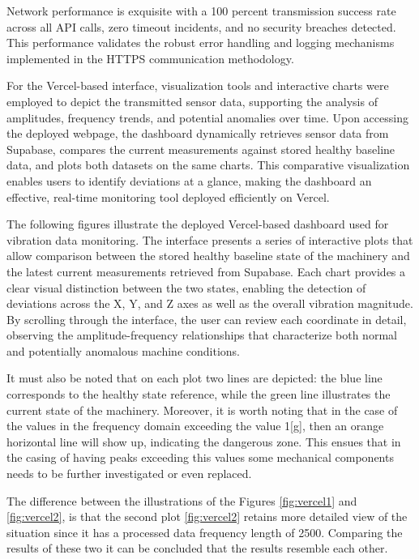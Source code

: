{	Network performance is exquisite with a 100 percent transmission success rate across all API calls, zero timeout incidents, and no security breaches detected. This performance validates the robust error handling and logging mechanisms implemented in the HTTPS communication methodology.
	
	For the Vercel-based interface, visualization tools and interactive charts were employed to depict the transmitted sensor data, supporting the analysis of amplitudes, frequency trends, and potential anomalies over time. Upon accessing the deployed webpage, the dashboard dynamically retrieves sensor data from Supabase, compares the current measurements against stored healthy baseline data, and plots both datasets on the same charts. This comparative visualization enables users to identify deviations at a glance, making the dashboard an effective, real-time monitoring tool deployed efficiently on Vercel.
	
	The following figures illustrate the deployed Vercel-based dashboard used for vibration data monitoring. The interface presents a series of interactive plots that allow comparison between the stored healthy baseline state of the machinery and the latest current measurements retrieved from Supabase. Each chart provides a clear visual distinction between the two states, enabling the detection of deviations across the X, Y, and Z axes as well as the overall vibration magnitude. By scrolling through the interface, the user can review each coordinate in detail, observing the amplitude-frequency relationships that characterize both normal and potentially anomalous machine conditions.
	
	It must also be noted that on each plot two lines are depicted: the blue line corresponds to the healthy state reference, while the green line illustrates the current state of the machinery. Moreover, it is worth noting that in the case of the values in the frequency domain exceeding the value 1[g], then an orange horizontal line will show up, indicating the dangerous zone. This ensues that in the casing of having peaks exceeding this values some mechanical components needs to be further investigated or even replaced.

	
	The difference between the illustrations of the Figures \ref{fig:vercel1} and \ref{fig:vercel2}, is that the second plot \ref{fig:vercel2} retains more detailed view of the situation since it has a processed data frequency length of 2500. Comparing the results of these two it can be concluded that the results resemble each other.
	
}

